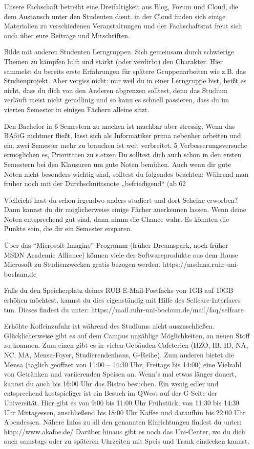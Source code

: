 Unsere Fachschaft betreibt eine Dreifaltigkeit aus Blog, Forum und Cloud, die dem Austausch unter den Studenten dient. in der Cloud finden sich einige Materialien zu verschiedenen Veranstaltungen und der Fachschaftsrat freut sich auch über eure Beiträge und Mitschriften.
	

  Bilde mit anderen Studenten Lerngruppen. Sich gemeinsam durch schwierige Themen zu kämpfen hilft und stärkt (oder verdirbt) den Charakter. Hier sammelst du bereits erste Erfahrungen für spätere Gruppenarbeiten wie z.B. das Studienprojekt. Aber vergiss nicht: nur weil du in einer Lerngruppe bist, heißt es nicht, dass du dich von den Anderen abgrenzen solltest, denn das Studium verläuft meist nicht geradlinig und so kann es schnell passieren, dass du im vierten Semester in einigen Fächern alleine sitzt.

Den Bachelor in 6 Semestern zu machen ist machbar aber stressig. Wenn das BAföG nichtmer fließt, lässt sich als Informatiker prima nebenher arbeiten und  ein, zwei Semester mehr zu brauchen ist weit verbreitet. 
5 Verbesserungsversuche ermöglichen es, Prioritäten zu s.etzen
Du solltest dich auch schon in den ersten Semestern bei den Klausuren um gute Noten bemühen. Auch wenn dir gute Noten nicht besonders wichtig sind, solltest du folgendes beachten: Während man früher noch mit der Durchschnittsnote „befriedigend“ (ab 62%

Vielleicht hast du schon irgendwo anders studiert und dort Scheine erworben? Dann kannst du dir möglicherweise einige Fächer anerkennen lassen. Wenn deine Noten entsprechend gut sind, dann nimm die Chance wahr. Es könnten die Punkte sein, die dir ein Semester ersparen. 

Über  das “Microsoft Imagine” Programm (früher Dreamspark, noch früher MSDN Academic Alliance) können viele der Softwareprodukte aus dem Hause Microsoft zu Studienzwecken gratis bezogen werden.
https://msdnaa.ruhr-uni-bochum.de

Falls du den Speicherplatz deines RUB-E-Mail-Postfachs von 1GB auf 10GB erhöhen möchtest, kannst du dies eigenständig mit Hilfe des Selfcare-Interfaces tun. Dieses findest du unter: https://mail.ruhr-uni-bochum.de/mail/faq/selfcare

Erhöhte Koffeinzufuhr ist während des Studiums nicht auszuschließen. Glücklicherweise gibt es auf dem Campus unzählige Möglichkeiten, an neuen Stoff zu kommen. Zum einen gibt es in vielen Gebäuden Cafeterien (HZO, IB, ID, NA, NC, MA, Mensa-Foyer, Studierendenhaus, G-Reihe). Zum anderen bietet die Mensa (täglich geöffnet von 11:00 – 14:30 Uhr, Freitags bis 14:00) eine Vielzahl von Getränken und variierenden Speisen an. Wenn's mal etwas länger dauert, kannst du auch bis 16:00 Uhr das Bistro besuchen. 
Ein wenig edler und entsprechend kostspieliger ist ein Besuch im QWest auf der G-Seite der Universität. Hier gibt es von 9:00 bis 11:00 Uhr Frühstück, von 11:30 bis 14:30 Uhr Mittagessen, anschließend bis 18:00 Uhr Kaffee und daraufhin bis 22:00 Uhr Abendessen.
Nähere Infos zu all den genannten Einrichtungen findest du unter: http://www.akafoe.de/
Darüber hinaus gibt es noch das Uni-Center, wo du dich auch samstags oder zu späteren Uhrzeiten mit Speis und Trank
eindecken kannst.


